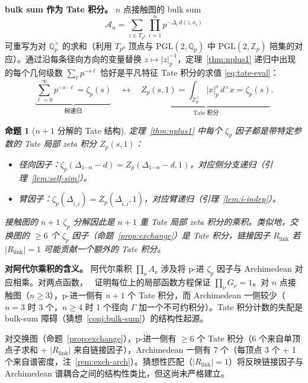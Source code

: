\documentclass[11pt,a4paper]{ctexart}
\newtheorem{proposition}[theorem]{命题}
\theoremstyle{remark}
\newcommand{\Qp}{\mathbb{Q}_p}
\newcommand{\Zp}{\mathbb{Z}_p}
\newcommand{\PGL}{\mathrm{PGL}}
\newcommand{\normp}[1]{|#1|_p}
\begin{document}
\textbf{bulk sum 作为 Tate 积分。} $n$ 点接触图的 bulk sum
\begin{equation}
\mathcal{A}_n = \sum_{z \in T_{p^d}} \prod_{i=1}^n p^{-\Delta_i\, d(z, x_i)}
\end{equation}
可重写为对 $\Qp^\times$ 的求和（利用 $T_{p^d}$ 顶点与 $\PGL(2, \Qp)$ 中 $\PGL(2, \Zp)$ 陪集的对应）。通过沿每条径向方向的变量替换 $z \mapsto \normp{z}^{-1}$，定理~\ref{thm:nplus1} 递归中出现的每个几何级数 $\sum_\ell p^{-s\ell}$ 恰好是平凡特征 Tate 积分的求值 \eqref{eq:tate-eval}：
\begin{equation}
\label{eq:tate-identification}
\underbrace{\sum_{\ell=0}^\infty p^{-s \cdot \ell} = \zeta_p(s)}_{\text{树递归}} \quad \longleftrightarrow \quad \underbrace{Z_p(s, 1) = \int_{\Zp^\times} \normp{x}^s\, d^\times x = \zeta_p(s)}_{\text{Tate 积分}}.
\end{equation}

\begin{proposition}[$n{+}1$ 分解的 Tate 结构]
\label{prop:tate}
定理~\ref{thm:nplus1} 中每个 $\zeta_p$ 因子都是带特定参数的 Tate 局部 zeta 积分 $Z_p(s, 1)$：
\begin{itemize}[leftmargin=2em]
    \item 径向因子：$\zeta_p(\Delta_{1\cdots n} - d) = Z_p(\Delta_{1\cdots n} - d, 1)$，对应侧分支递归（引理~\ref{lem:self-sim}）。
    \item 臂因子：$\zeta_p(\Delta_{\hat{i},i}) = Z_p(\Delta_{\hat{i},i}, 1)$，对应臂递归（引理~\ref{lem:i-indep}）。
\end{itemize}
接触图的 $n{+}1$ $\zeta_p$ 分解因此是 $n{+}1$ 重 Tate 局部 zeta 积分的乘积。类似地，交换图的 $\geq 6$ 个 $\zeta_p$ 因子（命题~\ref{prop:exchange}）是 Tate 积分，链接因子 $R_{\mathrm{link}}$ 若 $|R_{\mathrm{link}}| = 1$ 可能贡献一个额外的 Tate 积分。
\end{proposition}

\textbf{对阿代尔乘积的含义。} 阿代尔乘积 $\prod_\nu A_\nu$ 涉及将 p-进 $\zeta_p$ 因子与 Archimedean 对应相乘。对两点函数，~\cite{HSYZ20} 证明每位上的局部函数方程保证 $\prod_\nu G_\nu = 1$。对 $n$ 点接触图（$n \geq 3$），p-进一侧有 $n{+}1$ 个 Tate 积分，而 Archimedean 一侧较少（$n=3$ 时 3 个，$n \geq 4$ 时 1 个径向 $\Gamma$ 加一个不可约积分）。Tate 积分计数的失配是 bulk-sum 障碍（猜想~\ref{conj:bulk-sum}）的结构性起源。

对交换图（命题~\ref{prop:exchange}），p-进一侧有 $\geq 6$ 个 Tate 积分（6 个来自单顶点子求和 + $|R_{\mathrm{link}}|$ 来自链接因子），Archimedean 一侧有 7 个（每顶点 3 个 + 1 个来自谱密度，注~\ref{rem:exch-arch}）。猜想性匹配（$|R_{\mathrm{link}}| = 1$）将反映链接因子与 Archimedean 谱耦合之间的结构性类比，但这尚未严格建立。
\end{document}
